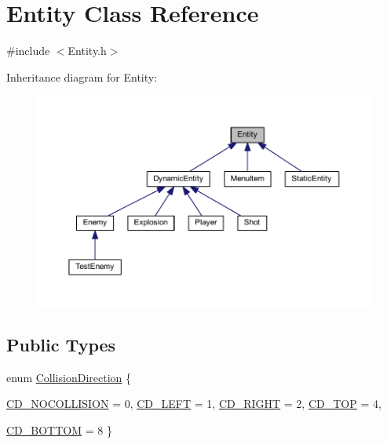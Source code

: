 \hypertarget{class_entity}{
\section{Entity Class Reference}
\label{d2/d96/class_entity}
}


{\ttfamily \#include $<$Entity.h$>$}



Inheritance diagram for Entity:
\nopagebreak
\begin{figure}[H]
\begin{center}
\leavevmode
\includegraphics[width=400pt]{d4/d72/class_entity__inherit__graph}
\end{center}
\end{figure}
\subsection*{Public Types}
\begin{DoxyCompactItemize}
\item 
enum \hyperlink{class_entity_a5931bff11a8d923b7af036a4344a2f89}{CollisionDirection} \{ \par
\hyperlink{class_entity_a5931bff11a8d923b7af036a4344a2f89acf9c0ab6b10506be862ab29d6191acbb}{CD\_\-NOCOLLISION} =  0, 
\hyperlink{class_entity_a5931bff11a8d923b7af036a4344a2f89a911697f02adea3d6c9c78fb5fcc778ad}{CD\_\-LEFT} =  1, 
\hyperlink{class_entity_a5931bff11a8d923b7af036a4344a2f89abad79a7716b05b024950c1e40c20fa46}{CD\_\-RIGHT} =  2, 
\hyperlink{class_entity_a5931bff11a8d923b7af036a4344a2f89a84fb96736cf7f8f7e199c4c3b6c99f1a}{CD\_\-TOP} =  4, 
\par
\hyperlink{class_entity_a5931bff11a8d923b7af036a4344a2f89a372dbad49c5f25e214a96934676e311b}{CD\_\-BOTTOM} =  8
 \}
\end{DoxyCompactItemize}
